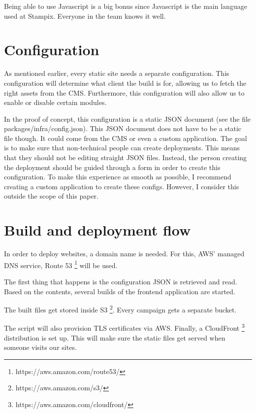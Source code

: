 Being able to use Javascript is a big bonus since Javascript is the main language used at Stampix. Everyone in the team knows it well.

\section{Configuration}

As mentioned earlier, every static site needs a separate configuration. 
This configuration will determine what client the build is for, allowing us to fetch the right assets from the CMS. 
Furthermore, this configuration will also allow us to enable or disable certain modules. 

In the proof of concept, this configuration is a static JSON document (see the file packages/infra/config.json). This JSON document does not have to be a static file though. 
It could come from the CMS or even a custom application. 
The goal is to make sure that non-technical people can create deployments. This means that they should not be editing straight JSON files.
Instead, the person creating the deployment should be guided through a form in order to create this configuration. 
To make this experience as smooth as possible, I recommend creating a custom application to create these configs. However, I consider this outside the scope of this paper.


\section{Build and deployment flow}

In order to deploy websites, a domain name is needed. For this, AWS' managed DNS service, Route 53 \footnote{https://aws.amazon.com/route53/} will be used.

The first thing that happens is the configuration JSON is retrieved and read. Based on the contents, several builds of the frontend application are started.

The built files get stored inside S3 \footnote{https://aws.amazon.com/s3/}. Every campaign gets a separate bucket.

The script will also provision TLS certificates via AWS. 
Finally, a CloudFront \footnote{https://aws.amazon.com/cloudfront/} distribution is set up. This will make sure the static files get served when someone visits our sites.